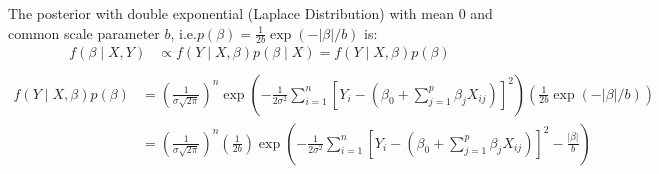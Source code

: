 \documentclass[10pt]{article}
\begin{document}
The posterior with double exponential (Laplace Distribution) with mean $0$ and common scale parameter $b$, i.e.$p(\beta) = \frac{1}{2b}\exp(- \lvert \beta
\rvert / b)$ is: 
\begin{align*}
f(\beta \mid X, Y)
    &\propto f(Y \mid X, \beta) p(\beta \mid X) = f(Y \mid X, \beta) p(\beta)\\
    &
\end{align*}
\begin{align*}
    f(Y \mid X, \beta)p(\beta)
    &=
    \left(
        \frac{
            1
        }{
            \sigma \sqrt{2\pi}
        }
    \right)^n
    \exp
    \left(
        - \frac{
            1
        }{
            2\sigma^2
        }
        \sum_{i = 1}^{n}
        \left[
            Y_i - (\beta_0 + \sum_{j = 1}^{p} \beta_j X_{ij})
        \right]^2
    \right)
    \left(
        \frac{
            1
        }{
            2b
        }
        \exp(- \lvert \beta \rvert / b)
    \right)
    \\
    &=
    \left(
        \frac{
            1
        }{
            \sigma \sqrt{2\pi}
        }
    \right)^n
    \left(
        \frac{
            1
        }{
            2b
        }
    \right)
    \exp
    \left(
        - \frac{
            1
        }{
            2\sigma^2
        }
        \sum_{i = 1}^{n}
        \left[
            Y_i - (\beta_0 + \sum_{j = 1}^{p} \beta_j X_{ij})
        \right]^2
        -
        \frac{
            \lvert \beta \rvert
        }{
            b
            }
    \right)
\end{align*}
\end{document}
